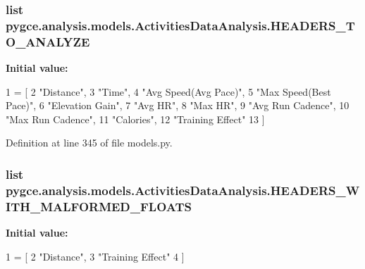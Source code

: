 \subsubsection[{\texorpdfstring{H\+E\+A\+D\+E\+R\+S\+\_\+\+T\+O\+\_\+\+A\+N\+A\+L\+Y\+ZE}{HEADERS_TO_ANALYZE}}]{\setlength{\rightskip}{0pt plus 5cm}list pygce.\+analysis.\+models.\+Activities\+Data\+Analysis.\+H\+E\+A\+D\+E\+R\+S\+\_\+\+T\+O\+\_\+\+A\+N\+A\+L\+Y\+ZE\hspace{0.3cm}{\ttfamily [static]}}\hypertarget{classpygce_1_1analysis_1_1models_1_1_activities_data_analysis_a799ad90125cc686b985fe525a3b33062}{}\label{classpygce_1_1analysis_1_1models_1_1_activities_data_analysis_a799ad90125cc686b985fe525a3b33062}
{\bfseries Initial value\+:}
\begin{DoxyCode}
1 = [
2         \textcolor{stringliteral}{"Distance"},
3         \textcolor{stringliteral}{"Time"},
4         \textcolor{stringliteral}{"Avg Speed(Avg Pace)"},
5         \textcolor{stringliteral}{"Max Speed(Best Pace)"},
6         \textcolor{stringliteral}{"Elevation Gain"},
7         \textcolor{stringliteral}{"Avg HR"},
8         \textcolor{stringliteral}{"Max HR"},
9         \textcolor{stringliteral}{"Avg Run Cadence"},
10         \textcolor{stringliteral}{"Max Run Cadence"},
11         \textcolor{stringliteral}{"Calories"},
12         \textcolor{stringliteral}{"Training Effect"}
13     ]
\end{DoxyCode}


Definition at line 345 of file models.\+py.

\subsubsection[{\texorpdfstring{H\+E\+A\+D\+E\+R\+S\+\_\+\+W\+I\+T\+H\+\_\+\+M\+A\+L\+F\+O\+R\+M\+E\+D\+\_\+\+F\+L\+O\+A\+TS}{HEADERS_WITH_MALFORMED_FLOATS}}]{\setlength{\rightskip}{0pt plus 5cm}list pygce.\+analysis.\+models.\+Activities\+Data\+Analysis.\+H\+E\+A\+D\+E\+R\+S\+\_\+\+W\+I\+T\+H\+\_\+\+M\+A\+L\+F\+O\+R\+M\+E\+D\+\_\+\+F\+L\+O\+A\+TS\hspace{0.3cm}{\ttfamily [static]}}\hypertarget{classpygce_1_1analysis_1_1models_1_1_activities_data_analysis_a272e010f956a64a8f916ebf1b9e14255}{}\label{classpygce_1_1analysis_1_1models_1_1_activities_data_analysis_a272e010f956a64a8f916ebf1b9e14255}
{\bfseries Initial value\+:}
\begin{DoxyCode}
1 = [
2         \textcolor{stringliteral}{"Distance"},
3         \textcolor{stringliteral}{"Training Effect"}
4     ]
\end{DoxyCode}


